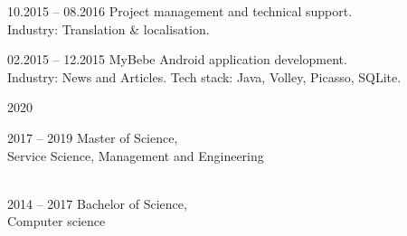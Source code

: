 \documentclass[12pt, a4paper]{article}
\newcommand{\subSectionSpace}{12pt}
\newcommand{\sectionSpace}{16pt}
\begin{document}
\begin{minipage}[t]{0.6\textwidth}
    \vspace{\subSectionSpace}
    
    \begin{subsec}{}{10.2015 – 08.2016}
        \>  Project management and technical support.   \\
        \>  Industry: Translation \& localisation.      \\
    \end{subsec}

    \vspace{\subSectionSpace}
    
    \begin{subsec}{}{02.2015 – 12.2015}
        \> MyBebe Android application development.              \\
        \> Industry: News and Articles.                         \lineend
        \> Tech stack: Java, Volley, Picasso, SQLite.           \\
    \end{subsec}
    
    \vspace{\sectionSpace}
    
    
    \vspace{\sectionSpace}
    
    \begin{subsec}{}{2020}
        \>  \\
    \end{subsec}
    
    \vspace{\subSectionSpace}
    
    \begin{subsec}{}{2017 – 2019}
        \> Master of Science,  \\
        \> Service Science, Management and Engineering \\
        \>  \\
    \end{subsec}
    
    \vspace{\subSectionSpace}
    
    \begin{subsec}{}{2014 – 2017}
        \> Bachelor of Science,  \\
        \> Computer science \\
    \end{subsec}
\end{minipage}
\end{document}
